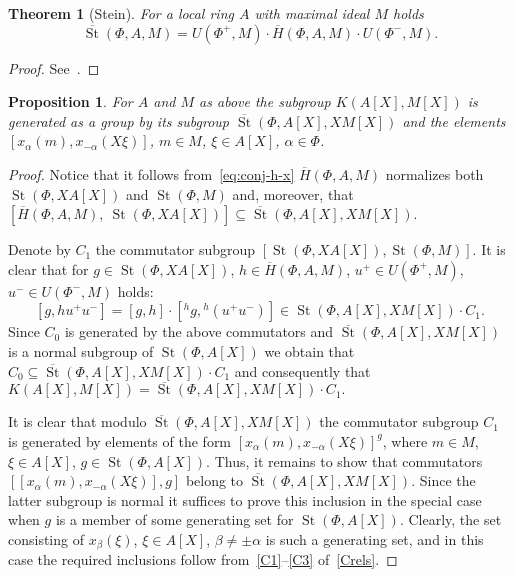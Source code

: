 \documentclass[oneside, 8pt]{amsart}
\newtheorem{prop}{Proposition}
\newtheorem{theorem}{Theorem}
\theoremstyle{remark}
\theoremstyle{definition}
\DeclareMathOperator{\St}{St}
\numberwithin{equation}{section}
\begin{document}
\begin{theorem}[Stein] \label{thmStein} For a local ring $A$ with maximal ideal $M$ holds \[\overline{\St}(\Phi, A, M) = U(\Phi^+, M) \cdot \overline{H}(\Phi, A, M) \cdot U(\Phi^-, M).\] \end{theorem} \begin{proof} See~\cite[Theorem~2.4]{Ste73}. \end{proof}

\begin{prop} \label{Kgen} For $A$ and $M$ as above the subgroup $K(A[X], M[X])$ is generated as a group by its subgroup $\overline{\St}(\Phi, A[X], XM[X])$ and
 the elements $[x_\alpha(m), x_{-\alpha}(X\xi)]$, $m \in M$, $\xi \in A[X]$, $\alpha \in \Phi$. \end{prop}
\begin{proof} Notice that it follows from~\eqref{eq:conj-h-x} $\overline{H}(\Phi, A, M)$ normalizes both $\St(\Phi, XA[X])$ and $\St(\Phi, M)$ and, moreover, that $[\overline{H}(\Phi, A, M),\ \St(\Phi, XA[X])] \subseteq \overline{\St}(\Phi, A[X], XM[X])$. 

Denote by $C_1$ the commutator subgroup $[\St(\Phi, XA[X]), \St(\Phi, M)]$.
It is clear that for $g \in \St(\Phi, XA[X])$, $h \in \overline{H}(\Phi, A, M)$, $u^+ \in U(\Phi^+, M)$, $u^- \in U(\Phi^-, M)$ holds:
\[ [g, h u^+ u^-] = [g, h] \cdot [{}^{h}\!g, {}^{h}\!(u^+u^-)] \in \St(\Phi, A[X], XM[X]) \cdot C_1.\]
Since $C_0$ is generated by the above commutators and $\overline{\St}(\Phi, A[X], XM[X])$ is a normal subgroup of $\St(\Phi, A[X])$
we obtain that $C_0 \subseteq \overline{\St}(\Phi, A[X], XM[X]) \cdot C_1$ and consequently that
$K(A[X], M[X]) = \overline{\St}(\Phi, A[X], XM[X]) \cdot C_1.$
 
It is clear that modulo $\overline{\St}(\Phi, A[X], XM[X])$ the commutator subgroup $C_1$ is generated by elements of the form $[x_\alpha(m), x_{-\alpha}(X\xi)]^g$, where $m \in M$, $\xi \in A[X]$, $g \in \St(\Phi, A[X])$.
Thus, it remains to show that commutators $[[x_\alpha(m), x_{-\alpha}(X\xi)], g]$ belong to $\overline{\St}(\Phi, A[X], XM[X])$.
Since the latter subgroup is normal it suffices to prove this inclusion in the special case when $g$ is a member of some generating set for $\St(\Phi, A[X])$.
Clearly, the set consisting of $x_\beta(\xi)$, $\xi \in A[X]$, $\beta \neq \pm \alpha$ is such a generating set, 
 and in this case the required inclusions follow from~\eqref{C1}--\eqref{C3} of~\cref{Crels}. \end{proof}
\end{document}
